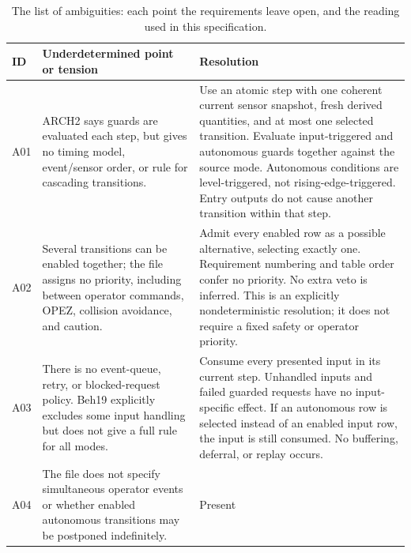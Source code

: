 \documentclass[
  10pt,
]{article}
\begin{document}
\begin{longtable}[]{@{}
  >{\raggedright\arraybackslash}p{}
  >{\raggedright\arraybackslash}p{}
  >{\raggedright\arraybackslash}p{}@{}}
\caption{The list of ambiguities: each point the requirements leave open, and the reading used in this specification.}\label{tab:ambiguities}\\
\toprule\noalign{}
\begin{minipage}[b]{\linewidth}\raggedright
ID
\end{minipage} & \begin{minipage}[b]{\linewidth}\raggedright
Underdetermined point or tension
\end{minipage} & \begin{minipage}[b]{\linewidth}\raggedright
Resolution
\end{minipage} \\
\midrule\noalign{}
\endhead
\bottomrule\noalign{}
\endlastfoot
A01 & ARCH2 says guards are evaluated each step, but gives no timing
model, event/sensor order, or rule for cascading transitions. & Use an
atomic step with one coherent current sensor snapshot, fresh derived
quantities, and at most one selected transition. Evaluate
input-triggered and autonomous guards together against the source mode.
Autonomous conditions are level-triggered, not rising-edge-triggered.
Entry outputs do not cause another transition within that step. \\
A02 & Several transitions can be enabled together; the file assigns no
priority, including between operator commands, OPEZ, collision
avoidance, and caution. & Admit every enabled row as a possible
alternative, selecting exactly one. Requirement numbering and table
order confer no priority. No extra veto is inferred. This is an
explicitly nondeterministic resolution; it does not require a fixed
safety or operator priority. \\
A03 & There is no event-queue, retry, or blocked-request policy. Beh19
explicitly excludes some input handling but does not give a full rule
for all modes. & Consume every presented input in its current step.
Unhandled inputs and failed guarded requests have no input-specific
effect. If an autonomous row is selected instead of an enabled input
row, the input is still consumed. No buffering, deferral, or replay
occurs. \\
A04 & The file does not specify simultaneous operator events or whether
enabled autonomous transitions may be postponed indefinitely. & Present

\end{longtable}
\end{document}
